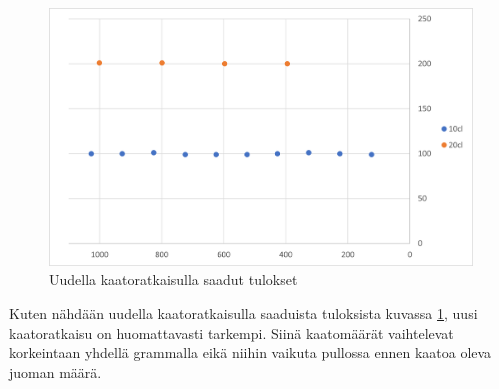 \begin{figure}[h]
\begin{center}
\includegraphics[scale=0.75]{img/kaadot_uusi_kesken.png}
\end{center}
\caption{Uudella kaatoratkaisulla saadut tulokset}
\label{fig:kaadot_uusi}
\end{figure}

Kuten nähdään uudella kaatoratkaisulla saaduista tuloksista kuvassa \ref{fig:kaadot_uusi}, uusi kaatoratkaisu on huomattavasti tarkempi. Siinä kaatomäärät vaihtelevat korkeintaan yhdellä grammalla eikä niihin vaikuta pullossa ennen kaatoa oleva juoman määrä.
